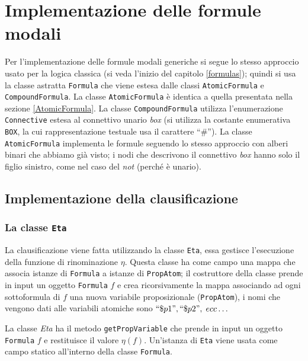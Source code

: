 \documentclass[a4paper,12pt]{report}
\begin{document}
\section{Implementazione delle formule modali}
Per l'implementazione delle formule modali generiche si segue lo stesso approccio usato per la logica classica (si veda l'inizio del capitolo \ref{formulas}); quindi si usa la classe astratta \texttt{Formula} che viene estesa dalle classi \texttt{AtomicFormula} e \texttt{CompoundFormula}. La classe \texttt{AtomicFormula} è identica a quella presentata nella sezione \ref{AtomicFormula}. La classe \texttt{CompoundFormula} utilizza l'enumerazione \texttt{Connective} estesa al connettivo unario \emph{box} (si utilizza la costante enumerativa \texttt{BOX}, la cui rappresentazione testuale usa il carattere ``$\#$''). La classe \texttt{AtomicFormula} implementa le formule seguendo lo stesso approccio con alberi binari che abbiamo già visto; i nodi che descrivono il connettivo \emph{box} hanno solo il figlio sinistro, come nel caso del \emph{not} (perché è unario).

\subsection{Implementazione della clausificazione}
\label{clausification_impl}
\subsubsection{La classe \texttt{Eta}}
La clausificazione viene fatta utilizzando la classe \texttt{Eta}, essa gestisce l'esecuzione della funzione di rinominazione $\eta$. Questa classe ha come campo una mappa che associa istanze di \texttt{Formula} a istanze di \texttt{PropAtom}; il costruttore della classe prende in input un oggetto \texttt{Formula} $f$ e crea ricorsivamente la mappa associando ad ogni sottoformula di $f$ una nuova variabile proposizionale (\texttt{PropAtom}), i nomi che vengono dati alle variabili atomiche sono $``\$p1", ``\$p2", \; ecc\dots$

La classe \emph{Eta} ha il metodo \texttt{getPropVariable} che prende in input un oggetto \texttt{Formula} $f$ e restituisce il valore $\eta(f)$. Un'istanza di \texttt{Eta} viene usata come campo statico all'interno della classe \texttt{Formula}.
\end{document}
